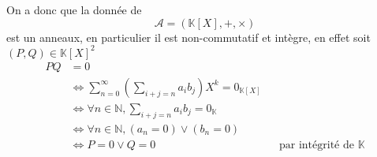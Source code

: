 \documentclass[11pt,colorlinks]{book}
\theoremstyle{mytheoremstyle}
\theoremstyle{mytheoremstyle}
\theoremstyle{mytheoremstyle}
\theoremstyle{mytheoremstyle}
\theoremstyle{mytheoremstyle}
\theoremstyle{mytheoremstyle}
\theoremstyle{mytheoremstyle}
\theoremstyle{mytheoremstyle}
\theoremstyle{myproblemstyle}
\def\mbb#1{\mathbb{#1}}
\def\mfc#1{\mathcal{#1}}
\def\bN{\mbb{N}}
\def\bK{\mbb{K}}
\begin{document}
\begin{rmq}
  On a donc que la donnée de
  \begin{equation*}
    \mfc A = (\bK[X],+,\times)
  \end{equation*}
  est un anneaux, en particulier il est non-commutatif et intègre, en effet soit $(P,Q) \in \bK[X]^2$
  \begin{align*}
    PQ &= 0 \\ 
    &\Leftrightarrow \sum_{n=0}^{\infty} \left(\sum_{i+j=n} a_i b_j\right) X^k = 0_{\bK[X]} \\ 
    &\Leftrightarrow \forall n \in \bN, \sum_{i+j=n} a_i b_j = 0_{\bK} \\ 
    &\Leftrightarrow \forall n \in \bN, (a_n=0) \vee (b_n=0) \\
    &\Leftrightarrow P=0 \vee Q=0 && \text{par intégrité de } \bK
  \end{align*}
\end{rmq}
\end{document}
